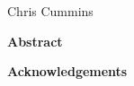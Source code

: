 \thispagestyle{plain}
\begin{center}
  \Large
  \textbf{\@title}

  \vspace{0.4cm}
  \large
  \subtitle{}

  \vspace{0.4cm}
  Chris Cummins

  \vspace{0.9cm}
  \textbf{Abstract}
\end{center}

\lipsum[1-3]

\begin{center}
    \large
    \vspace{0.9cm}
    \textbf{Acknowledgements}
\end{center}

\lipsum[4]

\newpage
